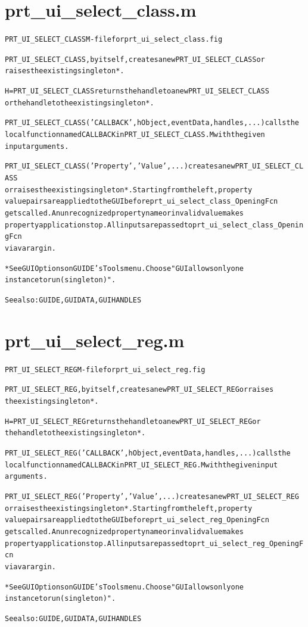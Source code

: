 \section{prt\_ui\_select\_class.m}
\begin{alltt}

 PRT\_UI\_SELECT\_CLASS M-file for prt\_ui\_select\_class.fig
 
 PRT\_UI\_SELECT\_CLASS, by itself, creates a new PRT\_UI\_SELECT\_CLASS or 
 raises the existing singleton*.
 
 H = PRT\_UI\_SELECT\_CLASS returns the handle to a new PRT\_UI\_SELECT\_CLASS 
 or the handle to the existing singleton*.
 
 PRT\_UI\_SELECT\_CLASS('CALLBACK',hObject,eventData,handles,...) calls the 
 local function named CALLBACK in PRT\_UI\_SELECT\_CLASS.M with the given 
 input arguments.
 
 PRT\_UI\_SELECT\_CLASS('Property','Value',...) creates a new PRT\_UI\_SELECT\_CLASS
 or raises the existing singleton*.  Starting from the left, property 
 value pairs are applied to the GUI before prt\_ui\_select\_class\_OpeningFcn 
 gets called.  An unrecognized property name or invalid value makes 
 property application stop.  All inputs are passed to prt\_ui\_select\_class\_OpeningFcn
 via varargin.
 
 *See GUI Options on GUIDE's Tools menu.  Choose "GUI allows only one
  instance to run (singleton)".
 
 See also: GUIDE, GUIDATA, GUIHANDLES
\end{alltt}


\section{prt\_ui\_select\_reg.m}
\begin{alltt}

 PRT\_UI\_SELECT\_REG M-file for prt\_ui\_select\_reg.fig
 
 PRT\_UI\_SELECT\_REG, by itself, creates a new PRT\_UI\_SELECT\_REG or raises 
 the existing singleton*.
 
 H = PRT\_UI\_SELECT\_REG returns the handle to a new PRT\_UI\_SELECT\_REG or 
 the handle to the existing singleton*.
 
 PRT\_UI\_SELECT\_REG('CALLBACK',hObject,eventData,handles,...) calls the 
 local function named CALLBACK in PRT\_UI\_SELECT\_REG.M with the given input
 arguments.
 
 PRT\_UI\_SELECT\_REG('Property','Value',...) creates a new PRT\_UI\_SELECT\_REG
 or raises the existing singleton*.  Starting from the left, property 
 value pairs are applied to the GUI before prt\_ui\_select\_reg\_OpeningFcn 
 gets called.  An unrecognized property name or invalid value makes 
 property application stop.  All inputs are passed to prt\_ui\_select\_reg\_OpeningFcn
 via varargin.
 
 *See GUI Options on GUIDE's Tools menu.  Choose "GUI allows only one
  instance to run (singleton)".
 
 See also: GUIDE, GUIDATA, GUIHANDLES
\end{alltt}


